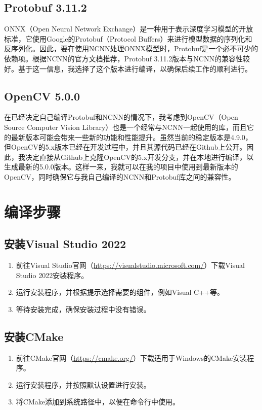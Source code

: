\subsection{Protobuf 3.11.2}

ONNX（Open Neural Network Exchange）是一种用于表示深度学习模型的开放标准，它使用Google的Protobuf（Protocol Buffers）来进行模型数据的序列化和反序列化。因此，要在使用NCNN处理ONNX模型时，Protobuf是一个必不可少的依赖项。根据NCNN的官方文档推荐，Protobuf 3.11.2版本与NCNN的兼容性较好。基于这一信息，我选择了这个版本进行编译，以确保后续工作的顺利进行。

\subsection{OpenCV 5.0.0}

在已经决定自己编译Protobuf和NCNN的情况下，我考虑到OpenCV（Open Source Computer Vision Library）也是一个经常与NCNN一起使用的库，而且它的最新版本可能会带来一些新的功能和性能提升。虽然当前的稳定版本是4.9.0，但OpenCV的5.x版本已经在开发过程中，并且其源代码已经在Github上公开。因此，我决定直接从Github上克隆OpenCV的5.x开发分支，并在本地进行编译，以生成最新的5.0.0版本。这样一来，我就可以在我的项目中使用到最新版本的OpenCV，同时确保它与我自己编译的NCNN和Protobuf库之间的兼容性。

\section{编译步骤}

\subsection{安装Visual Studio 2022}

\begin{enumerate}
	\item 前往Visual Studio官网（\url{https://visualstudio.microsoft.com/}）下载Visual Studio 2022安装程序。
	\item 运行安装程序，并根据提示选择需要的组件，例如Visual C++等。
	\item 等待安装完成，确保安装过程中没有错误。
\end{enumerate}

\subsection{安装CMake}

\begin{enumerate}
	\item 前往CMake官网（\url{https://cmake.org/}）下载适用于Windows的CMake安装程序。
	\item 运行安装程序，并按照默认设置进行安装。
	\item 将CMake添加到系统路径中，以便在命令行中使用。
\end{enumerate}

